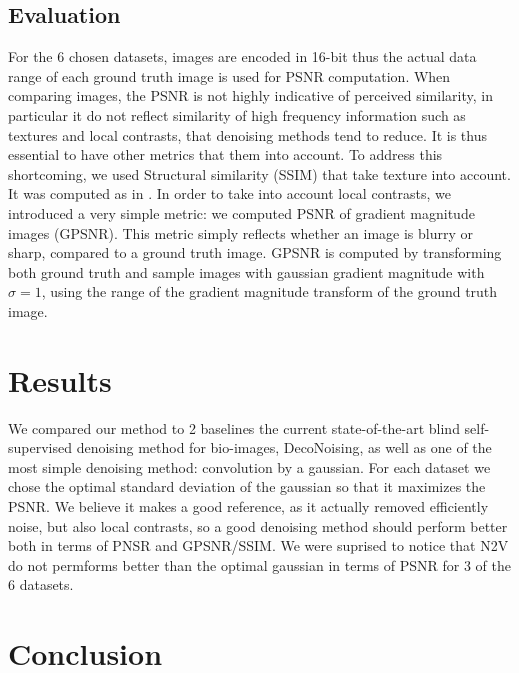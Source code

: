 \documentclass{article}
\begin{document}
\subsection{Evaluation}
For the 6 chosen datasets, images are encoded in 16-bit thus the actual data range of each ground truth image is used for PSNR computation.
When comparing images, the PSNR is not highly indicative of perceived similarity, in particular it do not reflect similarity of high frequency information such as textures and local contrasts\cite{wang2004image}, that denoising methods tend to reduce. It is thus essential to have other metrics that them into account.
To address this shortcoming, we used Structural similarity (SSIM) that take texture into account. It was computed as in \cite{wang2004image}.
In order to take into account local contrasts, we introduced a very simple metric: we computed PSNR of gradient magnitude images (GPSNR). This metric simply reflects whether an image is blurry or sharp, compared to a ground truth image.
GPSNR is computed by transforming both ground truth and sample images with gaussian gradient magnitude with $\sigma=1$, using the range of the gradient magnitude transform of the ground truth image.

\section{Results}
We compared our method to 2 baselines the current state-of-the-art blind self-supervised denoising method for bio-images, DecoNoising, as well as one of the most simple denoising method: convolution by a gaussian. For each dataset we chose the optimal standard deviation of the gaussian so that it maximizes the PSNR. We believe it makes a good reference, as it actually removed efficiently noise, but also local contrasts, so a good denoising method should perform better both in terms of PNSR and GPSNR/SSIM. We were suprised to notice that N2V do not permforms better than the optimal gaussian in terms of PSNR for 3 of the 6 datasets.


\section{Conclusion}



{\small


}
\end{document}
